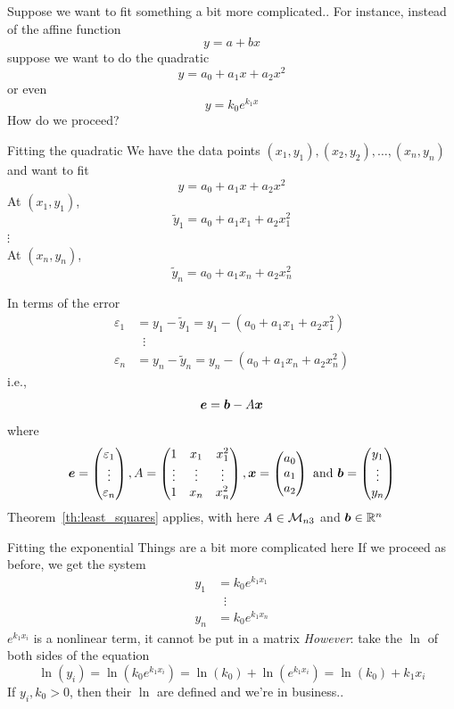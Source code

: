 \documentclass[aspectratio=169]{beamer}\usepackage[]{graphicx}\usepackage[]{xcolor}
\begin{document}
\begin{frame}{Suppose we want to fit something a bit more complicated..}
For instance, instead of the affine function
\[
y = a+bx
\]
suppose we want to do the quadratic
\[
y = a_0+a_1x+a_2x^2
\]
or even
\[
y = k_0 e^{k_1x}
\]
\vfill
How do we proceed?
\end{frame}


\begin{frame}{Fitting the quadratic}
We have the data points $(x_1,y_1),(x_2,y_2),\ldots,(x_n,y_n)$ and want to fit
\[
y = a_0+a_1x+a_2x^2
\]
At $(x_1,y_1)$,
\[
\tilde y_1 = a_0+a_1x_1+a_2x_1^2
\]
$\vdots$\\
At $(x_n,y_n)$,
\[
\tilde y_n = a_0+a_1x_n+a_2x_n^2
\]
\end{frame}

\begin{frame}
In terms of the error
\begin{align*}
\varepsilon_1 &= y_1-\tilde y_1 = y_1-(a_0+a_1x_1+a_2x_1^2) \\
&\;\;\vdots\\
\varepsilon_n &= y_n-\tilde y_n = y_n-(a_0+a_1x_n+a_2x_n^2)
\end{align*}
i.e.,
\[
\bm{e} = \bm{b}-A\bm{x} 
\]
where
\[
\bm{e} = \begin{pmatrix}
\varepsilon_1\\ \vdots\\ \varepsilon_n
\end{pmatrix},
A=\begin{pmatrix}
1 & x_1 & x_1^2\\ \vdots & \vdots & \vdots \\ 1 & x_n & x_n^2
\end{pmatrix},
\bm{x} = \begin{pmatrix}
a_0\\a_1\\a_2
\end{pmatrix}\textrm{ and }
\bm{b} = \begin{pmatrix}
y_1\\ \vdots\\ y_n
\end{pmatrix}
\]
\vfill
Theorem~\ref{th:least_squares} applies, with here $A\in\mathcal{M}_{n3}$ and $\bm{b}\in\mathbb{R}^n$
\end{frame}


\begin{frame}{Fitting the exponential}
Things are a bit more complicated here
\vfill
If we proceed as before, we get the system
\begin{align*}
y_1 &= k_0 e^{k_1x_1} \\
&\;\;\vdots \\
y_n &= k_0 e^{k_1x_n}
\end{align*}
$e^{k_1x_i}$ is a nonlinear term, it cannot be put in a matrix
\vfill
\emph{However}: take the $\ln$ of both sides of the equation
\[
\ln(y_i) = \ln(k_0e^{k_1x_i}) = \ln(k_0)+\ln(e^{k_1x_i}) = \ln(k_0)+k_1x_i
\]
If $y_i,k_0>0$, then their $\ln$ are defined and we're in business..
\end{frame}
\end{document}
